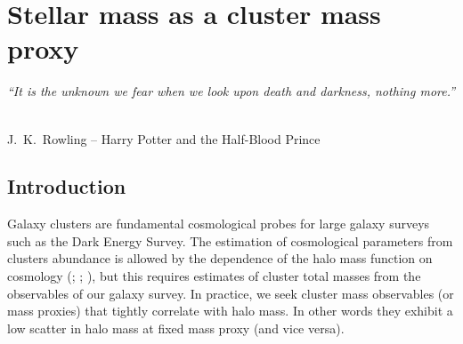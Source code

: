 \chapter{Stellar mass as a cluster mass proxy}\label{chp:proxy}

\begin{flushright}
  {\em ``It is the unknown we fear when we look upon death and darkness, nothing more.'' }\\

\ \

\normalsize
{J.~K.~Rowling -- Harry Potter and the Half-Blood Prince}  
\end{flushright}



\section{Introduction}
Galaxy  clusters  are fundamental cosmological probes for large galaxy surveys such as the Dark Energy Survey.  The estimation of cosmological parameters from clusters abundance is allowed by the dependence of the halo mass function on cosmology (\citealt{press}; \citealt{sheth}; \citealt{tinker}), but this requires estimates of cluster total masses from the observables of our galaxy survey. In practice, we seek cluster mass observables (or mass proxies) that tightly correlate with halo mass. In other words they exhibit a low scatter in halo mass at fixed mass proxy (and vice versa).

